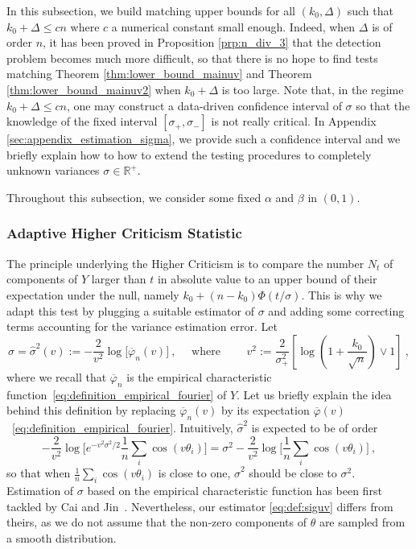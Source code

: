 \documentclass[twoside,11pt]{article}
\def\beq{\begin{equation}}
\def\eeq{\end{equation}}
\newcommand{\<}{\langle}
\renewcommand{\>}{\rangle}
\begin{document}
In this subsection, we build matching upper bounds for all $(k_0,\Delta)$ such that  $k_0+\Delta\leq cn$ where $c$ a numerical constant small enough. Indeed, when $\Delta$ is of order $n$, it has been proved in Proposition \ref{prp:n_div_3} that the detection problem becomes much more difficult, so that there is no hope to find tests matching Theorem \ref{thm:lower_bound_mainuv} and Theorem \ref{thm:lower_bound_mainuv2} when $k_0+\Delta$ is too large.  Note that, in the  regime $k_0+\Delta\leq cn$, one may construct a data-driven confidence interval of $\sigma$ so that the knowledge of the fixed interval $[\sigma_+,\sigma_-]$ is not really critical. In Appendix \ref{sec:appendix_estimation_sigma}, we provide such a confidence interval and we briefly explain how to how to extend the testing procedures to completely unknown variances $\sigma\in \mathbb{R}^+$. 

 Throughout this subsection, we consider some fixed $\alpha$ and $\beta$ in $(0,1)$. 





\subsubsection{Adaptive Higher Criticism Statistic}\label{sec:HCUV}


The principle underlying the Higher Criticism is to compare the number $N_t$ of components of $Y$ larger than $t$ in absolute value to an upper bound of their expectation under the null, namely $k_0+ (n-k_0)\Phi(t/\sigma)$. This is why we adapt this test by plugging a suitable estimator of $\sigma$ and adding some correcting terms accounting for the variance estimation error. Let 
\beq\label{eq:def:siguv}
\widehat{\sigma}= \widehat{\sigma}^2(v):= -\frac{2}{v^2}\log\big[\overline{\varphi}_n(v)\big]\ ,\quad \text{ where }\quad \quad  v^2 := \frac{2}{\sigma^2_+}[\log(1+\frac{k_0}{\sqrt{n}})\lor 1]\ ,
\eeq
where we recall that $\overline{\varphi}_n$ is the empirical characteristic function~\eqref{eq:definition_empirical_fourier} of $Y$. Let us briefly explain the idea behind this definition  by replacing $\overline{\varphi}_n(v)$ by its expectation $\overline{\varphi}(v)$~\eqref{eq:definition_empirical_fourier}. Intuitively, $\widehat{\sigma}^2$ is expected to be of order 
\beq\label{eq:pop_analysis_sigub}
 -\frac{2}{v^2}\log\big[e^{-v^2\sigma^2/2}\frac{1}{n}\sum_i\cos(v\theta_i)\big]= \sigma^2  - \frac{2}{v^2}\log\big[\frac{1}{n}\sum_{i}\cos(v\theta_i)\big]\ , 
\eeq
so that when $\tfrac{1}{n}\sum_{i}\cos(v\theta_i)$ is close to one, $\widehat{\sigma}^2$ should be close to $\sigma^2$. Estimation of $\sigma$ based on the empirical characteristic function has been first tackled   by Cai and Jin~\cite{MR2325113,MR2589318}. Nevertheless, our estimator \eqref{eq:def:siguv} differs from theirs, as we do not assume that the non-zero components of $\theta$ are sampled from a smooth distribution. 
\end{document}
